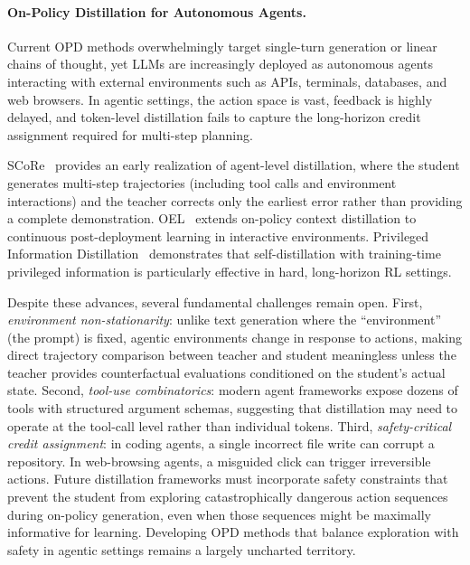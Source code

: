 \documentclass{article} %
\begin{document}
\paragraph{On-Policy Distillation for Autonomous Agents.}
Current OPD methods overwhelmingly target single-turn generation or linear chains of thought, yet LLMs are increasingly deployed as autonomous agents interacting with external environments such as APIs, terminals, databases, and web browsers. In agentic settings, the action space is vast, feedback is highly delayed, and token-level distillation fails to capture the long-horizon credit assignment required for multi-step planning.

SCoRe~\citep{2509.14257} provides an early realization of agent-level distillation, where the student generates multi-step trajectories (including tool calls and environment interactions) and the teacher corrects only the earliest error rather than providing a complete demonstration. OEL~\citep{2603.16856} extends on-policy context distillation to continuous post-deployment learning in interactive environments. Privileged Information Distillation~\citep{2602.04942} demonstrates that self-distillation with training-time privileged information is particularly effective in hard, long-horizon RL settings.

Despite these advances, several fundamental challenges remain open. First, \emph{environment non-stationarity}: unlike text generation where the ``environment'' (the prompt) is fixed, agentic environments change in response to actions, making direct trajectory comparison between teacher and student meaningless unless the teacher provides counterfactual evaluations conditioned on the student's actual state. Second, \emph{tool-use combinatorics}: modern agent frameworks expose dozens of tools with structured argument schemas, suggesting that distillation may need to operate at the tool-call level rather than individual tokens. Third, \emph{safety-critical credit assignment}: in coding agents, a single incorrect file write can corrupt a repository. In web-browsing agents, a misguided click can trigger irreversible actions. Future distillation frameworks must incorporate safety constraints that prevent the student from exploring catastrophically dangerous action sequences during on-policy generation, even when those sequences might be maximally informative for learning. Developing OPD methods that balance exploration with safety in agentic settings remains a largely uncharted territory.
\end{document}
